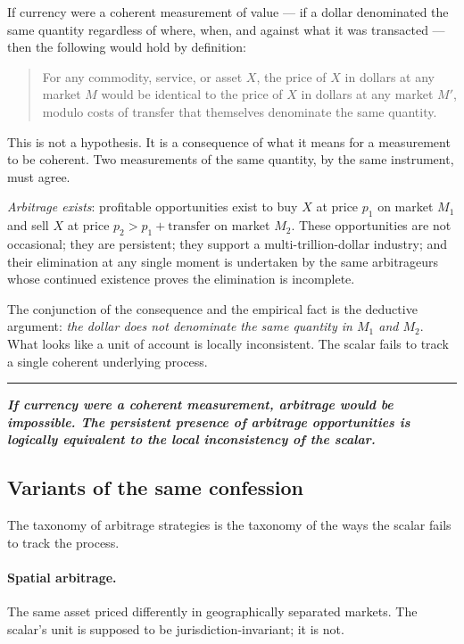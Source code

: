 \documentclass[11pt]{article}
\newcommand{\position}[1]{%
  \medskip
  \begin{quoting}[indentfirst=false, leftmargin=1em, rightmargin=1em]
  \noindent\textcolor{rhosky}{\rule{3pt}{1.2em}}\hspace{0.5em}\textbf{\textit{#1}}
  \end{quoting}
  \medskip
}
\begin{document}
If currency were a coherent measurement of value --- if a dollar denominated the same quantity regardless of where, when, and against what it was transacted --- then the following would hold by definition:

\begin{quote}
For any commodity, service, or asset $X$, the price of $X$ in dollars at any market $M$ would be identical to the price of $X$ in dollars at any market $M'$, modulo costs of transfer that themselves denominate the same quantity.
\end{quote}

This is not a hypothesis. It is a consequence of what it means for a measurement to be coherent. Two measurements of the same quantity, by the same instrument, must agree.

\emph{Arbitrage exists}: profitable opportunities exist to buy $X$ at price $p_1$ on market $M_1$ and sell $X$ at price $p_2 > p_1 + \text{transfer}$ on market $M_2$. These opportunities are not occasional; they are persistent; they support a multi-trillion-dollar industry; and their elimination at any single moment is undertaken by the same arbitrageurs whose continued existence proves the elimination is incomplete.

The conjunction of the consequence and the empirical fact is the deductive argument: \emph{the dollar does not denominate the same quantity in $M_1$ and $M_2$}. What looks like a unit of account is locally inconsistent. The scalar fails to track a single coherent underlying process.

\position{If currency were a coherent measurement, arbitrage would be impossible. The persistent presence of arbitrage opportunities is logically equivalent to the local inconsistency of the scalar.}

\subsection{Variants of the same confession}

The taxonomy of arbitrage strategies is the taxonomy of the ways the scalar fails to track the process.

\paragraph{Spatial arbitrage.} The same asset priced differently in geographically separated markets. The scalar's unit is supposed to be jurisdiction-invariant; it is not.
\end{document}
